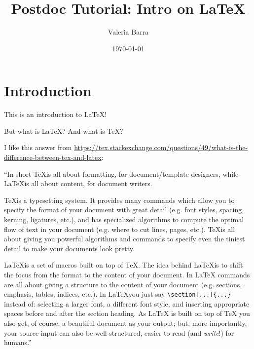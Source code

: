 \documentclass{article}
\title{Postdoc Tutorial: Intro on \LaTeX}
\author{Valeria Barra}
\date{\today}
\begin{document}
\maketitle

\tableofcontents

\listoffigures
 
\listoftables

\clearpage

\section*{Introduction} %

This is an introduction to \LaTeX!


But what is \LaTeX? And what is \TeX?

I like this answer from \url{https://tex.stackexchange.com/questions/49/what-is-the-difference-between-tex-and-latex}:

\vspace{\baselineskip} %

\noindent ``In short \TeX is all about formatting, for document/template designers, while \LaTeX is all about content, for document writers.

\noindent \TeX is a typesetting system. It provides many commands which allow you to specify the format of your document with great detail (e.g. font styles, spacing, kerning, ligatures, etc.), and has specialized algorithms to compute the optimal flow of text in your document (e.g. where to cut lines, pages, etc.). \TeX is all about giving you powerful algorithms and commands to specify even the tiniest detail to make your documents look pretty.

\noindent \LaTeX is a set of macros built on top of \TeX. The idea behind \LaTeX is to shift the focus from the format to the content of your document. In LaTeX commands are all about giving a structure to the content of your document (e.g. sections, emphasis, tables, indices, etc.). In \LaTeX you just say \texttt{\textbackslash section[...]\{...\}} instead of: selecting a larger font, a different font style, and inserting appropriate spaces before and after the section heading. As LaTeX is built on top of TeX you also get, of course, a beautiful document as your output; but, more importantly, your source input can also be well structured, easier to read (and \emph{write}!) for humans.''
\end{document}
